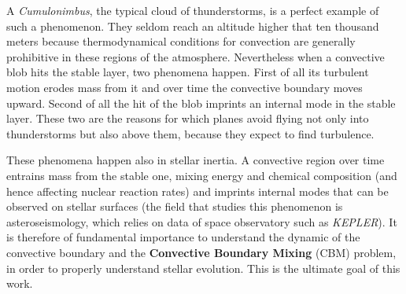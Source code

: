 A \textit{Cumulonimbus}, the typical cloud of thunderstorms, is a perfect example of such a phenomenon. They seldom reach an altitude higher that ten thousand meters because thermodynamical conditions for convection are generally prohibitive in these regions of the atmosphere. Nevertheless when a convective blob hits the stable layer, two phenomena happen. First of all its turbulent motion erodes mass from it and over time the convective boundary moves upward. Second of all the hit of the blob imprints an internal mode in the stable layer. These two are the reasons for which planes avoid flying not only into thunderstorms but also above them, because they expect to find turbulence. 

These phenomena happen also in stellar inertia. A convective region over time entrains mass from the stable one, mixing energy and chemical composition (and hence affecting nuclear reaction rates) and imprints internal modes that can be observed on stellar surfaces (the field that studies this phenomenon is asteroseismology, which relies on data of space observatory such as \textit{KEPLER}). It is therefore of fundamental importance to understand the dynamic of the convective boundary and the \textbf{Convective Boundary Mixing} (CBM) problem, in order to properly understand stellar evolution. This is the ultimate goal of this work.

